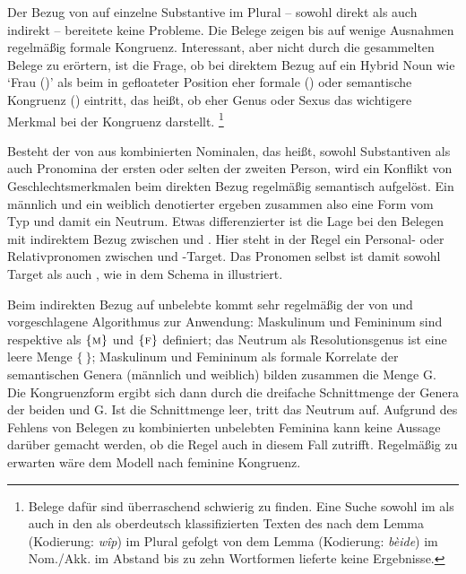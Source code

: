 Der Bezug von  auf einzelne Substantive im Plural --
sowohl direkt als auch indirekt -- bereitete keine Probleme. Die Belege zeigen
bis auf wenige Ausnahmen regelmäßig formale
Kongruenz. Interessant, aber nicht durch die gesammelten
Belege zu erörtern, ist die Frage, ob bei direktem Bezug auf ein Hybrid Noun
wie  `Frau (\NeutF)' als  beim  in
gefloateter Position eher formale
() oder semantische Kongruenz ()
eintritt, das heißt, ob eher Genus oder Sexus
das wichtigere Merkmal bei der Kongruenz darstellt.%
%
	\footnote{Belege dafür sind überraschend schwierig zu finden. Eine Suche
		sowohl im \CAO{} als auch in den als oberdeutsch klassifizierten Texten
		des \REM{} nach dem Lemma  (Kodierung: \emph{wîp}) im Plural
		gefolgt von dem Lemma  (Kodierung: \emph{bèide}) im
		Nom./Akk. im Abstand bis zu zehn Wortformen
		lieferte keine Ergebnisse.}

Besteht der  von  aus kombinierten Nominalen, das
heißt, sowohl Substantiven als auch Pronomina der ersten oder
selten der zweiten Person, wird ein Konflikt von
Geschlechtsmerkmalen beim direkten Bezug regelmäßig semantisch
aufgelöst. Ein männlich und ein weiblich denotierter
 ergeben zusammen also eine Form vom Typ  und
damit ein Neutrum. Etwas differenzierter ist die Lage bei den Belegen mit
indirektem Bezug zwischen  und . Hier steht in der
Regel ein Personal- oder
Relativpronomen zwischen  und
-Target. Das Pronomen selbst ist damit sowohl Target als auch
, wie in dem Schema in
 illustriert.

Beim indirekten Bezug auf unbelebte  kommt
sehr regelmäßig der von \citet[577]{wechsler2009} und
\citet[184]{wechslerzlatic2003} vorgeschlagene Algorithmus zur Anwendung:
Maskulinum und Femininum sind respektive als $\{\textsc{m}\}$ und
$\{\textsc{f}\}$ definiert; das Neutrum als Resolutionsgenus ist eine leere Menge $\{\ \}$; Maskulinum und Femininum als formale
Korrelate der semantischen Genera (männlich und weiblich) bilden
zusammen die Menge G. Die Kongruenzform ergibt sich dann durch die
dreifache Schnittmenge der Genera der beiden  und
G. Ist die Schnittmenge leer, tritt das Neutrum auf. Aufgrund des
Fehlens von Belegen zu kombinierten unbelebten Feminina kann
keine Aussage darüber gemacht werden, ob die Regel auch in diesem Fall
zutrifft. Regelmäßig zu erwarten wäre dem Modell nach feminine Kongruenz.

